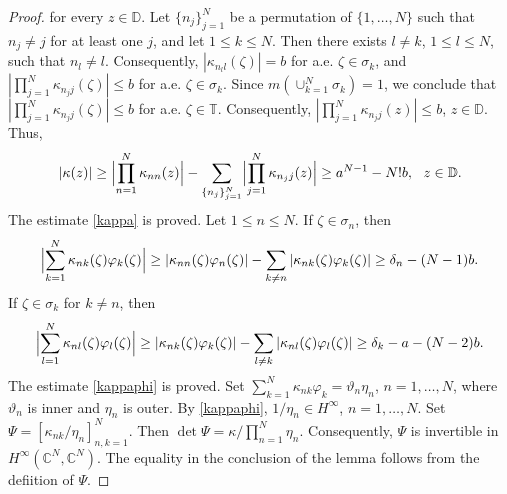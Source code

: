 \documentclass[10pt,a4paper]{amsart}
\begin{document}
\begin{proof}
for every $z\in\mathbb D$. Let $\{n_j\}_{j=1}^N$ be a permutation of $\{1,\ldots, N\}$  such that $n_j\neq j$ for at least one $j$, and let $1\leq k\leq N$. 
Then there exists $l\neq k$, $1\leq l\leq N$,  such that $n_l\neq l$. Consequently, 
$|\kappa_{n_l l}(\zeta)|=b$ for a.e. $\zeta\in\sigma_k$, and $|\prod_{j=1}^N\kappa_{n_j j}(\zeta)|\leq b$ 
for  a.e. $\zeta\in\sigma_k$. Since  $m(\cup_{k=1}^N\sigma_k)=1$, we conclude that 
$|\prod_{j=1}^N\kappa_{n_j j}(\zeta)|\leq b$ 
for  a.e. $\zeta\in\mathbb T$. Consequently, $|\prod_{j=1}^N\kappa_{n_j j}(z)|\leq b$, $z\in\mathbb D$.
 Thus, 
\begin{equation*}
|\kappa(z)|\geq\Bigl|\prod_{n=1}^N\kappa_{nn}(z)\Bigr|-\sum_{\{n_j\}_{j=1}^N}
\Bigl|\prod_{j=1}^N\kappa_{n_j j}(z)\Bigr|\geq
 a^{N-1}-N!b, \ \ z\in\mathbb D.
\end{equation*}
The estimate \eqref{kappa} is proved.
Let $1\leq n\leq N$. If $\zeta\in\sigma_n$, then 
 \begin{equation*}\Bigl|\sum_{k=1}^N\kappa_{nk}(\zeta)\varphi_k(\zeta)\Bigr|\geq
|\kappa_{nn}(\zeta)\varphi_n(\zeta)|-\sum_{k\neq n}|\kappa_{nk}(\zeta)\varphi_k(\zeta)|\geq\delta_n-(N-1)b.
\end{equation*} 
If $\zeta\in\sigma_k$ for $k\neq n$,  then 
 \begin{equation*} \Bigl|\sum_{l=1}^N\kappa_{nl}(\zeta)\varphi_l(\zeta)\Bigr|\geq
|\kappa_{nk}(\zeta)\varphi_k(\zeta)|-\sum_{l\neq k}|\kappa_{nl}(\zeta)\varphi_l(\zeta)|\geq\delta_k-a-(N-2)b.
\end{equation*} 
The estimate \eqref{kappaphi} is proved. Set $\sum_{k=1}^N\kappa_{nk}\varphi_k=\vartheta_n\eta_n$, $n=1,\ldots, N$, 
where $\vartheta_n$ is inner and $\eta_n$ is outer. By \eqref{kappaphi}, $1/\eta_n\in H^\infty$, $n=1,\ldots, N$. 
Set $\Psi=[\kappa_{nk}/\eta_n]_{n,k=1}^N$. Then   $\det\Psi=\kappa/\prod_{n=1}^N\eta_n$. Consequently, $\Psi$ 
is invertible 
in $H^\infty(\mathbb C^N, \mathbb C^N)$. The equality in the conclusion of the lemma follows from the defiition of $\Psi$.
\end{proof}
\end{document}
